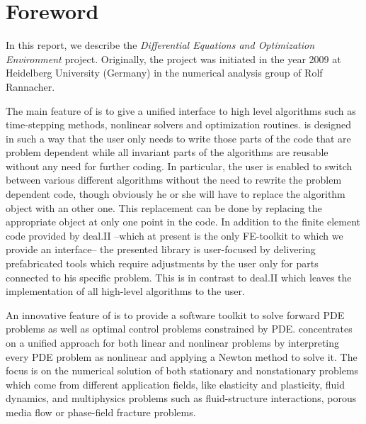\chapter{Foreword}
In this report, we describe the \dope{}
\textit{Differential Equations and  Optimization Environment} project. 
Originally, the project was initiated in the year 2009 at 
Heidelberg University (Germany) in the numerical analysis
group of Rolf Rannacher. 

The main feature of \dope{} is to give a unified interface to high level 
algorithms such as 
time-stepping methods, nonlinear solvers and optimization routines. 
\dope{} is designed in such a way that the user only needs to write those parts
of the code that are problem dependent while all invariant 
parts of the algorithms
are reusable without any need for further coding.
In particular, the user is enabled to switch between various different 
algorithms without the need to rewrite the problem dependent code, 
though obviously he or she will
have to replace the algorithm object with an other one. 
This replacement can be done by replacing the appropriate object at only
one point in the code.
In addition to the finite element code provided by deal.II --which at present is the only FE-toolkit to which we provide an 
interface-- 
the presented library
\dope{} is user-focused by delivering
prefabricated tools which require adjustments by the user only for parts
connected to his specific problem. 
This is in contrast to deal.II which leaves the implementation of all high-level algorithms to the user.

An innovative feature of \dope{} is to provide a software toolkit to solve forward PDE
problems as well as optimal control problems constrained by PDE. 
\dope{} concentrates on a unified approach for both linear and nonlinear
problems by interpreting every PDE problem as nonlinear and applying a
Newton method to solve it. 
The focus is on the numerical solution of both stationary and nonstationary
problems which come from different application fields, like elasticity and
plasticity, fluid dynamics, and multiphysics problems such as 
fluid-structure interactions, porous media flow or phase-field fracture problems.


